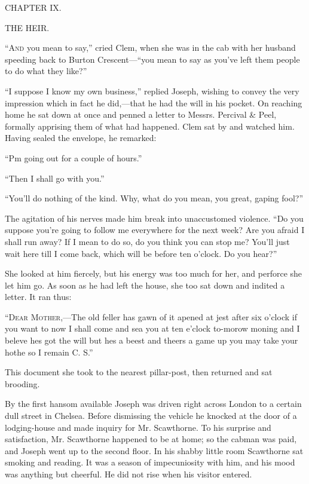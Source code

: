 {}

{CHAPTER IX.}

THE HEIR.

\textsc{``And} you mean to say,'' cried Clem, when she was in the cab
with her husband speeding back to Burton Crescent---``you mean to say as
you've left them people to do what they like?''

``I suppose I know my own business,'' replied Joseph, wishing to convey
the very impression which in fact he did,---that he had the will in his
pocket. On reaching home he sat down at once and penned a letter to
Messrs. Percival \& Peel, formally apprising them of what had happened.
Clem sat by and watched him. Having sealed the envelope, he remarked:

``Pm going out for a couple of hours.''

``Then I shall go with you.''

``You'll do nothing of the kind. Why, what do you mean, you great,
gaping fool?''

The agitation of his nerves made him break {}into unaccustomed violence.
``Do you suppose you're going to follow me everywhere for the next week?
Are you afraid I shall run away? If I mean to do so, do you think you
can stop me? You'll just wait here till I come back, which will be
before ten o'clock. Do you hear?''

She looked at him fiercely, but his energy was too much for her, and
perforce she let him go. As soon as he had left the house, she too sat
down and indited a letter. It ran thus:

``\textsc{Dear Mother},---The old feller has gawn of it apened at jest
after six o'clock if you want to now I shall come and sea you at ten
e'clock to-morow moning and I beleve hes got the will but hes a beest
and theers a game up you may take your hothe so I remain C. S.''

This document she took to the nearest pillar-post, then returned and sat
brooding.

By the first hansom available Joseph was driven right across London to a
certain dull street in Chelsea. Before dismissing the vehicle he knocked
at the door of a lodging-house and made inquiry for Mr. Scawthorne. To
his surprise and satisfaction, Mr. {}Scawthorne happened to be at home;
so the cabman was paid, and Joseph went up to the second floor. In his
shabby little room Scawthorne sat smoking and reading. It was a season
of impecuniosity with him, and his mood was anything but cheerful. He
did not rise when his visitor entered.

